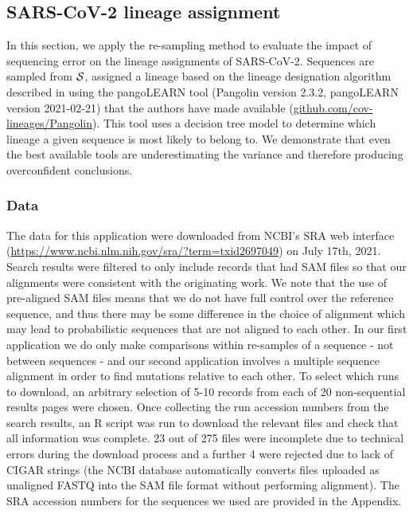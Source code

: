 \documentclass[12pt]{article}
\begin{document}
\subsection{SARS-CoV-2 lineage assignment}

In this section, we apply the re-sampling method to evaluate the impact of sequencing error on the lineage assignments of SARS-CoV-2.
Sequences are sampled from $\mathcal{S}$, assigned a lineage based on the lineage designation algorithm described in \cite{rambautDynamicNomenclatureProposal2020} using the pangoLEARN tool (Pangolin version 2.3.2, pangoLEARN version 2021-02-21) that the authors have made available (\url{github.com/cov-lineages/Pangolin}).
This tool uses a decision tree model to determine which lineage a given sequence is most likely to belong to.
We demonstrate that even the best available tools are underestimating the variance and therefore producing overconfident conclusions.

\subsubsection{Data}

The data for this application were downloaded from NCBI's SRA web interface (\url{https://www.ncbi.nlm.nih.gov/sra/?term=txid2697049}) on July 17th, 2021.
Search results were filtered to only include records that had SAM files so that our alignments were consistent with the originating work.
We note that the use of pre-aligned SAM files means that we do not have full control over the reference sequence, and thus there may be some difference in the choice of alignment which may lead to probabilistic sequences that are not aligned to each other.
In our first application we do only make comparisons within re-samples of a sequence - not between sequences - and our second application involves a multiple sequence alignment in order to find mutations relative to each other.
To select which runs to download, an arbitrary selection of 5-10 records from each of 20 non-sequential results pages were chosen.
Once collecting the run accession numbers from the search results, an R script was run to download the relevant files and check that all information was complete.
23 out of 275 files were incomplete due to technical errors during the download process and a further 4 were rejected due to lack of CIGAR strings (the NCBI database automatically converts files uploaded as unaligned FASTQ into the SAM file format without performing alignment). 
The SRA accession numbers for the sequences we used are provided in the Appendix. 
\end{document}
